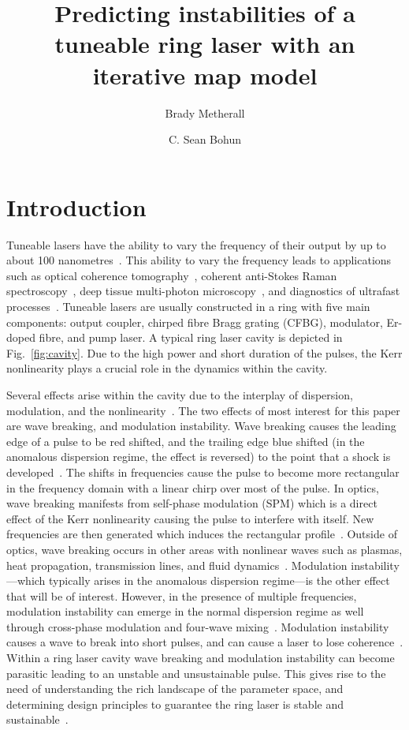 \documentclass[9pt,twocolumn,twoside]{osajnl}
\title{Predicting instabilities of a tuneable ring laser with an iterative map model}
\author[1]{Brady Metherall}
\author[2,*]{C. Sean Bohun}
\affil[1]{Mathematical Institute, University of Oxford, Radcliffe Observatory Quarter, Woodstock Rd, Oxford OX2 6GG, UK}
\affil[2]{Facutlty of Science, University of Ontario Institute of Technology, 2000 Simcoe St N, Oshawa, ON L1G 0C5, Canada}
\affil[3]{brady.metherall@maths.ox.ac.uk}
\affil[4]{sean.bohun@ontariotechu.ca}
\begin{document}
\maketitle

\section{Introduction}
\label{sec:intro}
Tuneable lasers have the ability to vary the frequency of their output by up to about 100 nanometres~\cite{bohun2015, burgoyne2010, yamashita2009}. This ability to vary the frequency leads to applications such as optical coherence tomography~\cite{bohun2015, burgoyne2014, yamashita2009}, coherent anti-Stokes Raman spectroscopy~\cite{burgoyne2014}, deep tissue multi-photon microscopy~\cite{chung2017}, and diagnostics of ultrafast processes~\cite{burgoyne2014, silfvast2004}. Tuneable lasers are usually constructed in a ring with five main components: output coupler, chirped fibre Bragg grating (CFBG), modulator, Er-doped fibre, and pump laser. A typical ring laser cavity is depicted in Fig.~\ref{fig:cavity}. Due to the high power and short duration of the pulses, the Kerr nonlinearity plays a crucial role in the dynamics within the cavity.

Several effects arise within the cavity due to the interplay of dispersion, modulation, and the nonlinearity~\cite{bohun2015, coen1997, lapre2019, meng2020, shao2019, woodward2018}. The two effects of most interest for this paper are wave breaking, and modulation instability. Wave breaking causes the leading edge of a pulse to be red shifted, and the trailing edge blue shifted (in the anomalous dispersion regime, the effect is reversed) to the point that a shock is developed~\cite{anderson1992, rothenberg1989a, rothenberg1989b, tomlinson1984, tomlinson1985}. The shifts in frequencies cause the pulse to become more rectangular in the frequency domain with a linear chirp over most of the pulse. In optics, wave breaking manifests from self-phase modulation (SPM) which is a direct effect of the Kerr nonlinearity causing the pulse to interfere with itself. New frequencies are then generated which induces the rectangular profile~\cite{agrawal2013, woodward2018}. Outside of optics, wave breaking occurs in other areas with nonlinear waves such as plasmas, heat propagation, transmission lines, and fluid dynamics~\cite{rothenberg1989b}. Modulation instability---which typically arises in the anomalous dispersion regime---is the other effect that will be of interest. However, in the presence of multiple frequencies, modulation instability can emerge in the normal dispersion regime as well through cross-phase modulation and four-wave mixing~\cite{agrawal1987, agrawal2013, haelterman1992}. Modulation instability causes a wave to break into short pulses, and can cause a laser to lose coherence~\cite{agrawal1987, coen1997, haelterman1992}. Within a ring laser cavity wave breaking and modulation instability can become parasitic leading to an unstable and unsustainable pulse. This gives rise to the need of understanding the rich landscape of the parameter space, and determining design principles to guarantee the ring laser is stable and sustainable~\cite{bohun2015, burgoyneemail, finot2008, lapre2019, woodward2018}.
\end{document}
